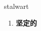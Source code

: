 
\begin{frame}
{\huge stalwart}
\begin{center}
\begin{enumerate}\Large
  \item \textbf{坚定的}
\end{enumerate}
\end{center}
\end{frame}
